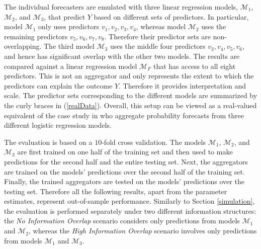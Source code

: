 \documentclass[12pt]{article}
\theoremstyle{definition}
\theoremstyle{definition}
\begin{document}
The individual forecasters are emulated with three linear regression models, $\mathcal{M}_1$, $\mathcal{M}_2$, and $\mathcal{M}_3$, that predict $Y$ based on different sets of predictors. In particular, model $\mathcal{M}_1$ only uses predictors $v_1, v_2, v_3, v_4$, whereas model $\mathcal{M}_2$ uses the remaining predictors $v_5, v_6, v_7, v_8$. Therefore their predictor sets are non-overlapping. The third model $\mathcal{M}_3$ uses the middle four predictors $v_3, v_4, v_5, v_6$, and hence has significant overlap with the other two models. The results are compared against a linear regression model $\mathcal{M}_F$ that has access to all eight predictors. This is not an aggregator and only represents the extent to which the predictors can explain the outcome $Y$. Therefore it provides interpretation and scale. The predictor sets corresponding to the different models are summarized by the curly braces in (\ref{realData}). Overall, this setup can be viewed as a real-valued equivalent of the case study in \cite{Ranjan08} who aggregate probability forecasts from three different logistic regression models. 

The evaluation is based on a $10$-fold cross validation. The models $\mathcal{M}_1$, $\mathcal{M}_2$, and $\mathcal{M}_3$ are first trained on one half of the training set and then used to make  predictions for the second half and the entire testing set. Next, the aggregators are  trained on the models' predictions over the second half of the training set. Finally, the trained aggregators are tested on the models' predictions over the testing set. Therefore all the following results, apart from the parameter estimates, represent out-of-sample performance. Similarly to Section \ref{simulation}, the evaluation is performed separately under two different information structures: the \textit{No Information Overlap} scenario considers only predictions from models $\mathcal{M}_1$ and $\mathcal{M}_2$, whereas the \textit{High Information Overlap} scenario involves only predictions from models $\mathcal{M}_1$ and $\mathcal{M}_3$. 
\end{document}
